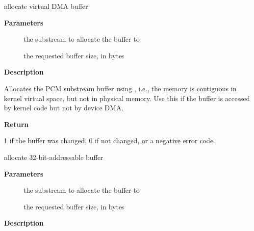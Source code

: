 \documentclass[a4paper,8pt,english]{sphinxmanual}
\begin{document}
\begin{fulllineitems}
\label{sound/kernel-api/alsa-driver-api:c.snd_pcm_lib_alloc_vmalloc_buffer}
allocate virtual DMA buffer

\end{fulllineitems}


\textbf{Parameters}
\begin{description}
\item[{}] \leavevmode
the substream to allocate the buffer to

\item[{}] \leavevmode
the requested buffer size, in bytes

\end{description}

\textbf{Description}

Allocates the PCM substream buffer using , i.e., the memory is
contiguous in kernel virtual space, but not in physical memory.  Use this
if the buffer is accessed by kernel code but not by device DMA.

\textbf{Return}

1 if the buffer was changed, 0 if not changed, or a negative error
code.

\begin{fulllineitems}
\label{sound/kernel-api/alsa-driver-api:c.snd_pcm_lib_alloc_vmalloc_32_buffer}
allocate 32-bit-addressable buffer

\end{fulllineitems}


\textbf{Parameters}
\begin{description}
\item[{}] \leavevmode
the substream to allocate the buffer to

\item[{}] \leavevmode
the requested buffer size, in bytes

\end{description}

\textbf{Description}
\end{document}
